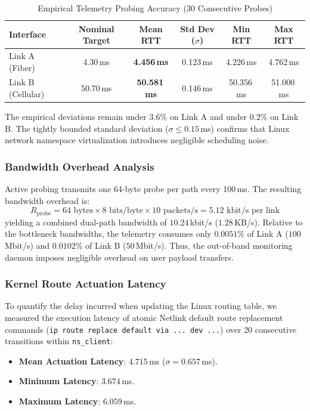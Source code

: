 \begin{table}[htbp]
\caption{Empirical Telemetry Probing Accuracy (30 Consecutive Probes)}
\label{tab:telemetry_accuracy}
\centering
\begin{tabular}{lccccc}
\toprule
\textbf{Interface} & \textbf{Nominal Target} & \textbf{Mean RTT} & \textbf{Std Dev ($\sigma$)} & \textbf{Min RTT} & \textbf{Max RTT} \\
\midrule
Link A (Fiber) & 4.30\,ms & \textbf{4.456\,ms} & 0.123\,ms & 4.226\,ms & 4.762\,ms \\
Link B (Cellular) & 50.70\,ms & \textbf{50.581\,ms} & 0.146\,ms & 50.356\,ms & 51.000\,ms \\
\bottomrule
\end{tabular}
\end{table}

The empirical deviations remain under $3.6\%$ on Link A and under $0.2\%$ on Link B. The tightly bounded standard deviation ($\sigma \le 0.15$\,ms) confirms that Linux network namespace virtualization introduces negligible scheduling noise.

\subsubsection{Bandwidth Overhead Analysis}
Active probing transmits one 64-byte probe per path every 100\,ms. The resulting bandwidth overhead is:
\begin{equation}
R_{\text{probe}} = 64\text{ bytes} \times 8\text{ bits/byte} \times 10\text{ packets/s} = 5.12\text{ kbit/s per link}
\end{equation}
yielding a combined dual-path bandwidth of $10.24$\,kbit/s ($1.28$\,KB/s). Relative to the bottleneck bandwidths, the telemetry consumes only $0.0051\%$ of Link A ($100$\,Mbit/s) and $0.0102\%$ of Link B ($50$\,Mbit/s). Thus, the out-of-band monitoring daemon imposes negligible overhead on user payload transfers.

\subsubsection{Kernel Route Actuation Latency}
To quantify the delay incurred when updating the Linux routing table, we measured the execution latency of atomic Netlink default route replacement commands (\texttt{ip route replace default via ... dev ...}) over 20 consecutive transitions within \texttt{ns\_client}:
\begin{itemize}
    \item \textbf{Mean Actuation Latency}: $\mathbf{4.715}$\,ms ($\sigma = 0.657$\,ms).
    \item \textbf{Minimum Latency}: $3.674$\,ms.
    \item \textbf{Maximum Latency}: $6.059$\,ms.
\end{itemize}

